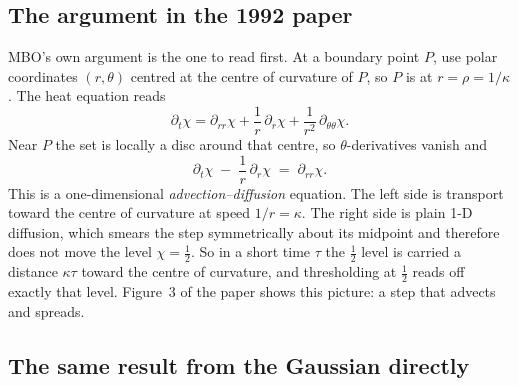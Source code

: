 \subsection{The argument in the 1992 paper}

MBO's own argument \cite[\S3]{merriman1992diffusion} is the one to read first.
At a boundary point $P$, use polar coordinates $(r, \theta)$ centred at the
centre of curvature of $P$, so $P$ is at $r = \rho = 1/\kappa$. The heat equation
reads
\[
  \partial_t \chi = \partial_{rr}\chi + \frac1r\,\partial_r\chi
                   + \frac{1}{r^2}\,\partial_{\theta\theta}\chi .
\]
Near $P$ the set is locally a disc around that centre, so $\theta$-derivatives
vanish and
\begin{equation}
  \partial_t \chi \;-\; \frac1r\,\partial_r \chi \;=\; \partial_{rr}\chi .
  \label{eq:ch1-advdiff}
\end{equation}
This is a one-dimensional \emph{advection--diffusion} equation. The left side
is transport toward the centre of curvature at speed $1/r = \kappa$. The right
side is plain 1-D diffusion, which smears the step symmetrically about its
midpoint and therefore does not move the level $\chi = \tfrac12$. So in a short
time $\tau$ the $\tfrac12$ level is carried a distance $\kappa\tau$ toward the
centre of curvature, and thresholding at $\tfrac12$ reads off exactly that
level. Figure~3 of the paper shows this picture: a step that advects and spreads.

\subsection{The same result from the Gaussian directly}

